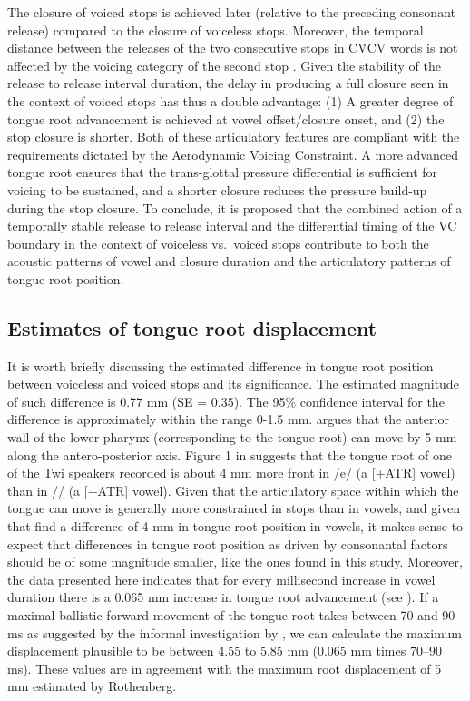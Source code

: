 \documentclass[preprint]{JASAnew}
\begin{document}
The closure of voiced stops is achieved later (relative to the preceding
consonant release) compared to the closure of voiceless stops. Moreover,
the temporal distance between the releases of the two consecutive stops
in CV́CV words is not affected by the voicing category of the second stop
\citep{coretta2019k}. Given the stability of the release to release
interval duration, the delay in producing a full closure seen in the
context of voiced stops has thus a double advantage: (1) A greater
degree of tongue root advancement is achieved at vowel offset/closure
onset, and (2) the stop closure is shorter. Both of these articulatory
features are compliant with the requirements dictated by the Aerodynamic
Voicing Constraint. A more advanced tongue root ensures that the
trans-glottal pressure differential is sufficient for voicing to be
sustained, and a shorter closure reduces the pressure build-up during
the stop closure. To conclude, it is proposed that the combined action
of a temporally stable release to release interval and the differential
timing of the VC boundary in the context of voiceless vs.~voiced stops
contribute to both the acoustic patterns of vowel and closure duration
and the articulatory patterns of tongue root position.

\hypertarget{estimates-of-tongue-root-displacement}{%
\subsection{Estimates of tongue root
displacement}\label{estimates-of-tongue-root-displacement}}

It is worth briefly discussing the estimated difference in tongue root
position between voiceless and voiced stops and its significance. The
estimated magnitude of such difference is 0.77 mm (SE = 0.35). The 95\%
confidence interval for the difference is approximately within the range
0-1.5 mm. \citet{rothenberg1967} argues that the anterior wall of the
lower pharynx (corresponding to the tongue root) can move by 5 mm along
the antero-posterior axis. Figure 1 in \citet{kirkham2017} suggests that
the tongue root of one of the Twi speakers recorded is about 4 mm more
front in /e/ (a {[}+ATR{]} vowel) than in /\textepsilon{}/ (a {[}−ATR{]}
vowel). Given that the articulatory space within which the tongue can
move is generally more constrained in stops than in vowels, and given
that \citet{kirkham2017} find a difference of 4 mm in tongue root
position in vowels, it makes sense to expect that differences in tongue
root position as driven by consonantal factors should be of some
magnitude smaller, like the ones found in this study. Moreover, the data
presented here indicates that for every millisecond increase in vowel
duration there is a 0.065 mm increase in tongue root advancement (see
). If a maximal ballistic forward movement of the
tongue root takes between 70 and 90 ms as suggested by the informal
investigation by \citet{rothenberg1967}, we can calculate the maximum
displacement plausible to be between 4.55 to 5.85 mm (0.065 mm times
70--90 ms). These values are in agreement with the maximum root
displacement of 5 mm estimated by Rothenberg.
\end{document}

